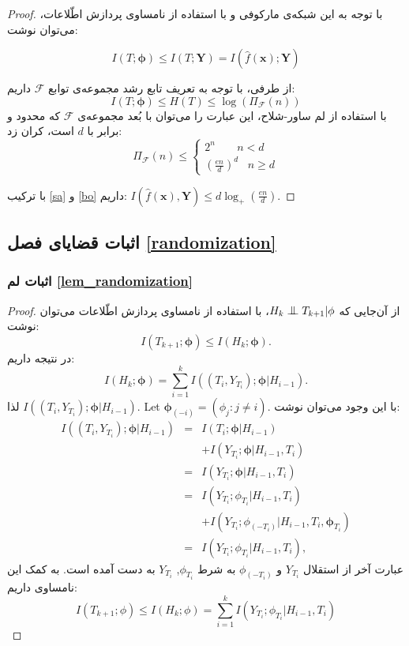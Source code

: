 \documentclass[a4paper,12pt]{article}
\newcommand{\bfphi}{\bm {\phi}}
\newcommand{\bigCI}{\mathrel{\text{\scalebox{1.07}{$\perp\mkern-10mu\perp$}}}}
\begin{document}
\begin{proof}
		با توجه به این شبکه‌ی مارکوفی و با استفاده از نامساوی پردازش اطّلاعات، می‌توان نوشت:
		
		$$I(T; \bfphi) \leq I(T; \mathbf{Y}) = I(\hat{f}(\mathbf{x}); \mathbf{Y})$$
		
		از طرفی، با توجه به تعریف تابع رشد مجموعه‌ی توابع 
		$\mathcal{F}$
		داریم: 
		\begin{equation}
		I(T;\bfphi) \leq H(T) \leq \log(\Pi_\mathcal{F}(n))
		\label{sa}
		\end{equation}
		با استفاده از لم ساور-شلاح، این عبارت را می‌توان با بُعد 
		مجموعه‌ی 
		$\mathcal{F}$
		که محدود و برابر با 
		$d$
		است، کران‌ زد:
		\begin{equation}
		\Pi_\mathcal{F} (n) \leq
		\begin{cases}
		2^n \;\;\;\;\;\;\; n<d\\
		(\frac{en}{d})^d \;\;\; n\geq d
		\end{cases}
		\label{bo}
		\end{equation}
		
		با ترکیب
		\eqref{sa}
		و
		\eqref{bo}
		داریم:
		$I(\hat{f}(\mathbf{x}), \mathbf{Y}) \leq d \log_+(\frac{en}{d})$.
		
	\end{proof}
	
	
	\subsection{اثبات قضایای فصل
		\ref{randomization}}
	\subsubsection{اثبات لم
		\eqref{lem_randomization}}
	\begin{proof}
		از آن‌جایی که 
		$H_{k} \bigCI T_{k+1}| \phi$،
		با استفاده از نامساوی پردازش اطّلاعات می‌توان نوشت:
		\[
		I(T_{k+1} ; \bfphi) \leq I(H_{k} ; \bfphi).
		\]
		در نتیجه داریم:
		\[
		I( H_k ; \bfphi) = \sum_{i=1}^{k} I\left( (T_i, Y_{T_i}) ; \bfphi |  H_{i-1} \right).
		\]
		لذا
		$I\left( (T_i, Y_{T_i}) ; \bfphi |  H_{i-1} \right)$. Let $\bfphi_{(-i)} = (\phi_{j} : j \neq i)$.
		با این وجود می‌توان نوشت:
		\begin{eqnarray*}
			I\left( (T_i, Y_{T_i}) ; \bfphi |  H_{i-1} \right)&=& I\left( T_i ; \bfphi |  H_{i-1} \right)\\
			&&+ I\left( Y_{T_i} ; \bfphi |  H_{i-1}, T_i \right)\\
			&=& I\left( Y_{T_i} ; \bfphi |  H_{i-1}, T_i \right)\\
			&=& I(Y_{T_i}; \phi_{T_i} | H_{i-1}, T_i )\\
			&&+I(Y_{T_i}; \phi_{(-T_{i})} | H_{i-1}, T_i, \bfphi_{T_i}) \\
			&=& I(Y_{T_i}; \phi_{T_i} | H_{i-1}, T_i ),
		\end{eqnarray*}
		عبارت آخر از استقلال 
		$Y_{T_i}$
		و 
		$ \phi_{(-T_i)}$
		به شرط $\phi_{T_i}$, $Y_{T_i}$ به دست آمده است. به کمک این نامساوی داریم:
		$$I(T_{k+1}; \phi) \leq I(H_k;\phi) = \sum_{i = 1}^{k} I(Y_{T_i};\phi_{T_i}| H_{i-1}, T_i)$$
	\end{proof}
\end{document}
